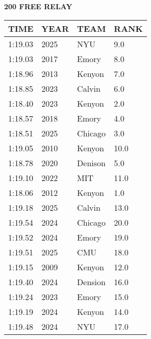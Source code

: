 \begin{center}
\begin{minipage}[t]{0.7\textwidth}
\centering
\textbf{200 FREE RELAY}\\[0.05cm]
\begin{tabular}{@{}p{1.8cm}p{1.2cm}p{1.4cm}p{0.8cm}@{}}
\hline
\textbf{TIME} & \textbf{YEAR} & \textbf{TEAM} & \textbf{RANK} \\
\hline
1:19.03 & 2025 & NYU & 9.0 \\
1:19.03 & 2017 & Emory & 8.0 \\
1:18.96 & 2013 & Kenyon & 7.0 \\
1:18.85 & 2023 & Calvin & 6.0 \\
1:18.40 & 2023 & Kenyon & 2.0 \\
1:18.57 & 2018 & Emory & 4.0 \\
1:18.51 & 2025 & Chicago & 3.0 \\
1:19.05 & 2010 & Kenyon & 10.0 \\
1:18.78 & 2020 & Denison & 5.0 \\
1:19.10 & 2022 & MIT & 11.0 \\
1:18.06 & 2012 & Kenyon & 1.0 \\
1:19.18 & 2025 & Calvin & 13.0 \\
1:19.54 & 2024 & Chicago & 20.0 \\
1:19.52 & 2024 & Emory & 19.0 \\
1:19.51 & 2025 & CMU & 18.0 \\
1:19.15 & 2009 & Kenyon & 12.0 \\
1:19.40 & 2024 & Dension & 16.0 \\
1:19.24 & 2023 & Emory & 15.0 \\
1:19.19 & 2024 & Kenyon & 14.0 \\
1:19.48 & 2024 & NYU & 17.0 \\
\hline
\end{tabular}
\end{minipage}
\end{center}

\vspace{0.4cm}

